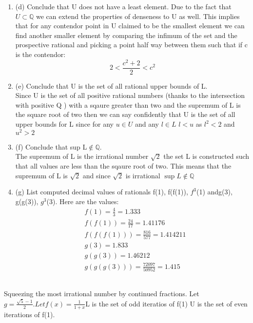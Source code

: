 \documentclass[11pt]{article}
\theoremstyle{definition}  %
\newcommand{\Q}{\mathbb{Q}}
\begin{document}
\begin{enumerate}
  \item (d) Conclude that U does not have a least element.
  Due to the fact that $U \subset \Q $ we can extend the properties of denseness to U as well. This implies that for any contendor point in U claimed to be the smallest element we can find another smaller element by comparing the infimum of the set and the prospective rational and picking a point half way between them such that if c is the contendor:
  \[
    2< \frac{c^2+2}{2}<c^2
  \]
  \item (e) Conclude that U is the set of all rational upper bounds of L.\\
  Since U is the set of all positive rational numbers (thanks to the intersection with positive Q ) with a sqaure greater than two and the supremum of L is the square root of two then we can say confidently that U is the set of all upper bounds for L since for any $u \in U$ and any $l \in L $ $l< u $ as $l^2<2$ and $u^2>2$
  \item (f) Conclude that sup L$\notin \Q$.\\
  The supremum of L is the irrational number $\sqrt{2}$ the set L is constructed such that all values are less than the sqaure root of two. This means that the supremum of L is $\sqrt{2}$ and since $\sqrt{2}$ is irrational $\sup L \notin \Q$
  \item (g) List computed decimal values of rationals f(1), f(f(1)), $f^3$(1) andg(3), g(g(3)), $g^3$(3).
  Here are the values:
  \begin{align*}
    &f(1)= \frac{4}{3}=1.333\\
    &f(f(1))=\frac{24}{17}=1.41176\\
    &f(f(f(1)))=\frac{816}{577}=1.414211\\
    &g(3)=1.833\\
    &g(g(3))=1.46212\\
    &g(g(g(3)))=\frac{72097}{50952}=1.415
  \end{align*}

\end{enumerate}
\\
Squeezing the most irrational number by continued fractions. Let $g=\frac{\sqrt{5}-1}{2}. Let f(x)=\frac{1}{1+x}$L is the set of odd iteratios of f(1) U is the set of even iterations of f(1).\\
\end{document}
